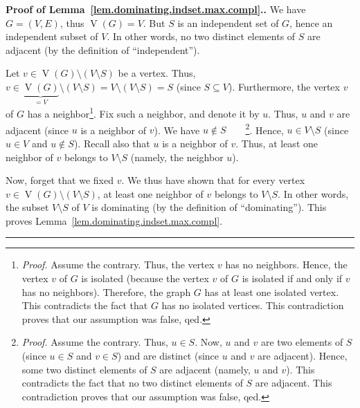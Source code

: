 \documentclass[numbers=enddot,12pt,final,onecolumn,notitlepage]{scrartcl}%
\theoremstyle{definition}
\newenvironment{proof}[1][Proof]{\noindent\textbf{#1.} }{\ \rule{0.5em}{0.5em}}
\newcommand{\tup}[1]{\left( #1 \right)}
\newcommand{\verts}[1]{\operatorname{V}\left( #1 \right)}
\begin{document}
\begin{proof}[Proof of Lemma~\ref{lem.dominating.indset.max.compl}.]
We have $G = \tup{V, E}$, thus $\verts{G} = V$.
But $S$ is an independent set of $G$, hence an independent subset of
$V$. In other words, no two distinct elements of $S$ are adjacent
(by the definition of ``independent'').

Let $v \in \verts{G} \setminus \tup{V \setminus S}$ be a vertex.
Thus,
$v \in \underbrace{\verts{G}}_{= V} \setminus \tup{V \setminus S}
= V \setminus \tup{V \setminus S} = S$ (since $S \subseteq V$).
Furthermore, the vertex $v$ of $G$ has a
neighbor\footnote{\textit{Proof.} Assume the contrary. Thus, the
vertex $v$ has no neighbors. Hence, the vertex $v$ of $G$ is
isolated (because the vertex $v$ of $G$ is isolated if and only if
$v$ has no neighbors). Therefore, the graph $G$ has at least one
isolated vertex. This contradicts the fact that $G$ has no isolated
vertices. This contradiction proves that our assumption was false,
qed.}. Fix such a neighbor, and denote it by $u$. Thus, $u$ and $v$
are adjacent (since $u$ is a neighbor of $v$).
We have $u \notin S$\ \ \ \ \footnote{\textit{Proof.} Assume the
contrary. Thus, $u \in S$. Now, $u$ and $v$ are two elements
of $S$ (since $u \in S$ and $v \in S$) and are distinct (since $u$ and
$v$ are adjacent). Hence, some two distinct elements of $S$ are
adjacent (namely, $u$ and $v$). This contradicts the fact that no two
distinct elements of $S$ are adjacent. This contradiction proves that
our assumption was false, qed.}. Hence, $u \in V \setminus S$ (since
$u \in V$ and $u \notin S$). Recall also that $u$ is a neighbor of
$v$. Thus, at least one neighbor of $v$ belongs to $V \setminus S$
(namely, the neighbor $u$).

Now, forget that we fixed $v$. We thus have shown that for every
vertex $v \in \verts{G} \setminus \tup{V \setminus S}$, at least one
neighbor of $v$ belongs to $V \setminus S$. In other words, the subset
$V \setminus S$ of $V$ is dominating (by the definition of
``dominating''). This proves
Lemma~\ref{lem.dominating.indset.max.compl}.
\end{proof}
\end{document}

